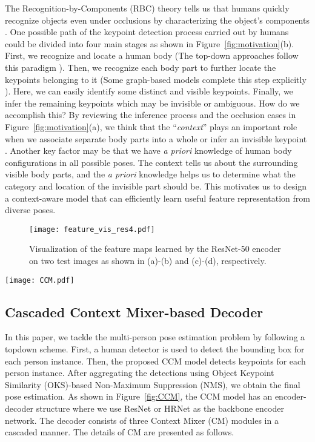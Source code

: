 \documentclass[twocolumn]{svjour3}          \smartqed  \usepackage{natbib}
\begin{document}
The Recognition-by-Components (RBC) theory tells us that humans quickly recognize objects even under occlusions by characterizing the object's components \citep{biederman1987recognition}. One possible path of the keypoint detection process carried out by humans could be divided into four main stages as shown in Figure~\ref{fig:motivation}(b). First, we recognize and locate a human body (The top-down approaches follow this paradigm \citep{chen2018cascaded,xiao2018simple,sun2019deep}). Then, we recognize each body part to further locate the keypoints belonging to it (Some graph-based models complete this step explicitly \citep{felzenszwalb2008discriminatively, holt2011putting, wang2013beyond, yang2013articulated}). Here, we can easily identify some distinct and visible keypoints. Finally, we infer the remaining keypoints which may be invisible or ambiguous. How do we accomplish this? By reviewing the inference process and the occlusion cases in Figure~\ref{fig:motivation}(a), we think that the ``\emph{context}'' plays an important role when we associate separate body parts into a whole or infer an invisible keypoint \citep{chen2020recursive,ma2020auto}. Another key factor may be that we have \emph{a priori} knowledge of human body configurations in all possible poses. The context tells us about the surrounding visible body parts, and the \emph{a priori} knowledge helps us to determine what the category and location of the invisible part should be. This motivates us to design a context-aware model that can efficiently learn useful feature representation from diverse poses.

\begin{figure}[t]
\centering
\texttt{[image: feature\_vis\_res4.pdf]}
\caption{Visualization of the feature maps learned by the ResNet-50 encoder on two test images as shown in (a)-(b) and (c)-(d), respectively.}
\label{fig:feat_vis_res4}
\end{figure}

\begin{figure*}[t]
\centering
\texttt{[image: CCM.pdf]}
\caption{The diagram of the proposed human keypoint detection model based on cascaded context mixer (CCM).}
\label{fig:CCM}
\end{figure*}

\subsection{Cascaded Context Mixer-based Decoder}
\label{subsec:cam}
In this paper, we tackle the multi-person pose estimation problem by following a topdown scheme. First, a human detector is used to detect the bounding box for each person instance. Then, the proposed CCM model detects keypoints for each person instance. After aggregating the detections using Object Keypoint Similarity (OKS)-based Non-Maximum Suppression (NMS), we obtain the final pose estimation. As shown in Figure~\ref{fig:CCM}, the CCM model has an encoder-decoder structure where we use ResNet \citep{he2016deep} or HRNet \citep{sun2019deep} as the backbone encoder network. The decoder consists of three Context Mixer (CM) modules in a cascaded manner. The details of CM are presented as follows.
\end{document}
